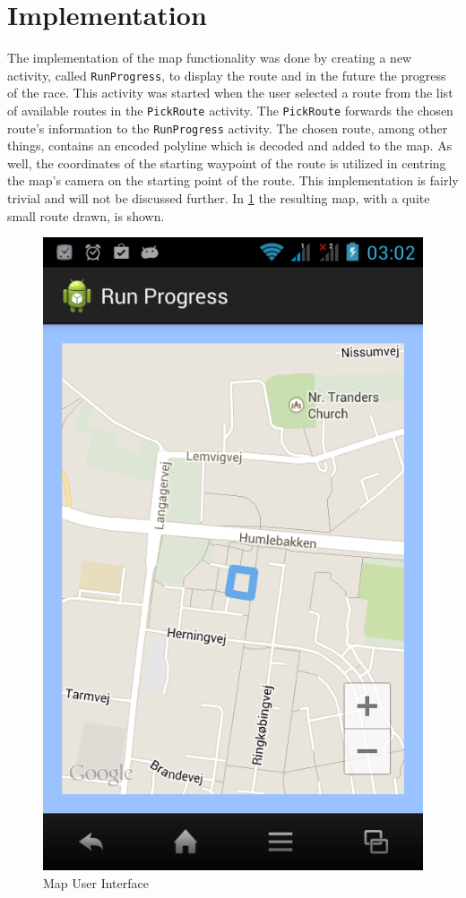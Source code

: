 \section{Implementation}
The implementation of the map functionality was done by creating a new activity, called \texttt{RunProgress}, to display the route and in the future the progress of the race. This activity was started when the user selected a route from the list of available routes in the \texttt{PickRoute} activity. The \texttt{PickRoute} forwards the chosen route's information to the \texttt{RunProgress} activity. The chosen route, among other things, contains an encoded polyline which is decoded and added to the map. As well, the coordinates of the starting waypoint of the route is utilized in centring the map's camera on the starting point of the route. This implementation is fairly trivial and will not be discussed further. In \ref{fig:runProgressV1} the resulting map, with a quite small route drawn, is shown.

\begin{figure}[ht]
\begin{center}
 \caption{Map User Interface}
 \label{fig:runProgressV1}
 \includegraphics[scale=0.4]{img/runProgressV1.png}
\end{center}
\end{figure}

